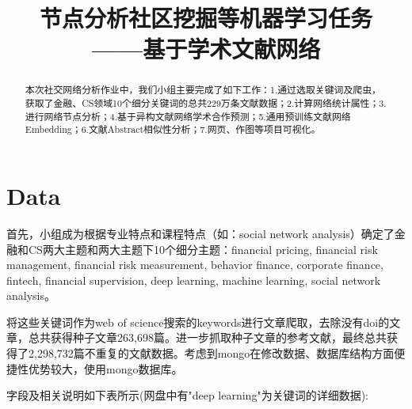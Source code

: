 \documentclass{bmvc2k}
\title{节点分析社区挖掘等机器学习任务\\ ——基于学术文献网络}
\begin{document}
\maketitle

\begin{abstract}
本次社交网络分析作业中，我们小组主要完成了如下工作：1.通过选取关键词及爬虫，获取了金融、CS领域10个细分关键词的总共229万条文献数据；2.计算网络统计属性；3.进行网络节点分析；4.基于异构文献网络学术合作预测；5.通用预训练文献网络Embedding；6.文献Abstract相似性分析；7.网页、作图等项目可视化。
\end{abstract}

\section{Data}
首先，小组成为根据专业特点和课程特点（如：social network analysis）确定了金融和CS两大主题和两大主题下10个细分主题：financial pricing, financial risk management, financial risk measurement, behavior finance, corporate finance, fintech, financial supervision, deep learning, machine learning, social network analysis。

将这些关键词作为web of science搜索的keywords进行文章爬取，去除没有doi的文章，总共获得种子文章263,698篇。进一步抓取种子文章的参考文献，最终总共获得了2,298,732篇不重复的文献数据。考虑到mongo在修改数据、数据库结构方面便捷性优势较大，使用mongo数据库。

字段及相关说明如下表所示(网盘中有"deep learning"为关键词的详细数据):
\end{document}
